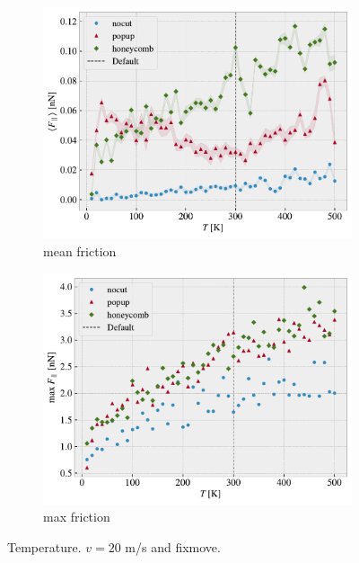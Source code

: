 \begin{figure}[H]
  \centering
  \begin{subfigure}[b]{0.49\textwidth}
      \centering
      \includegraphics[width=\textwidth]{figures/baseline/variables_temp_mean_fixmove_v20.pdf}
      \caption{mean friction}
      \label{fig:var_temp_mean}
  \end{subfigure}
  \hfill
  \begin{subfigure}[b]{0.49\textwidth}
      \centering
      \includegraphics[width=\textwidth]{figures/baseline/variables_temp_max_fixmove_v20.pdf}
      \caption{max friction}
      \label{fig:var_temp_max}
  \end{subfigure}
  \hfill
     \caption{Temperature. $v = 20$ m/s and fixmove.}
     \label{fig:var_temp}
\end{figure}





